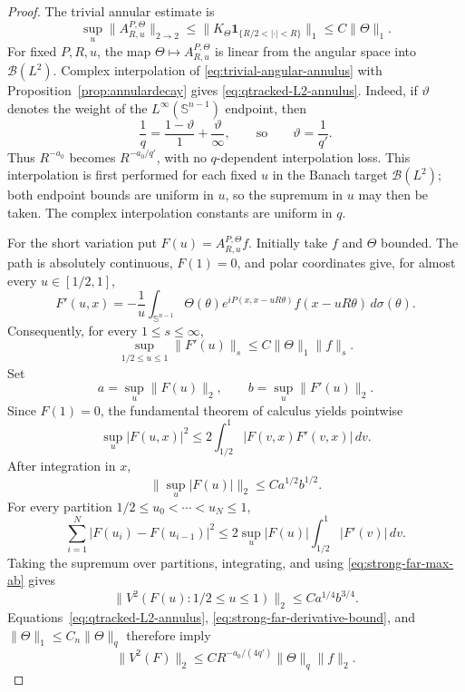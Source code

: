 \documentclass[11pt]{article}
\numberwithin{equation}{section}
\theoremstyle{remark}
\theoremstyle{definition}
\newcommand{\Sph}{\mathbb S}
\newcommand{\norm}[1]{\lVert #1\rVert}
\begin{document}
\begin{proof}
The trivial annular estimate is
\begin{equation}\label{eq:trivial-angular-annulus}
 \sup_u\norm{A^{P,\Theta}_{R,u}}_{2\to2}
 \leq \norm{K_\Theta\mathbf1_{\{R/2<|\cdot|<R\}}}_1
 \leq C\norm\Theta_1.
\end{equation}
For fixed $P,R,u$, the map
$\Theta\mapsto A^{P,\Theta}_{R,u}$ is linear from the angular space into
$\mathcal B(L^2)$.  Complex interpolation of
\eqref{eq:trivial-angular-annulus} with
Proposition~\ref{prop:annulardecay} gives
\eqref{eq:qtracked-L2-annulus}.  Indeed, if $\vartheta$ denotes the weight
of the $L^\infty(\Sph^{n-1})$ endpoint, then
\[
 \frac1q=\frac{1-\vartheta}{1}+\frac{\vartheta}{\infty},
 \qquad\text{so}\qquad \vartheta=\frac1{q'}.
\]
Thus $R^{-a_0}$ becomes $R^{-a_0/q'}$, with no $q$-dependent
interpolation loss.  This interpolation is first performed for each fixed
$u$ in the Banach target $\mathcal B(L^2)$; both endpoint bounds are
uniform in $u$, so the supremum in $u$ may then be taken.  The complex
interpolation constants are uniform in $q$.

For the short variation put $F(u)=A^{P,\Theta}_{R,u}f$.  Initially take
$f$ and $\Theta$ bounded.  The path is absolutely continuous, $F(1)=0$,
and polar coordinates give, for almost every $u\in[1/2,1]$,
\begin{equation}\label{eq:strong-far-derivative}
 F'(u,x)=-\frac1u\int_{\Sph^{n-1}}\Theta(\theta)
 e^{iP(x,x-uR\theta)}f(x-uR\theta)\,d\sigma(\theta).
\end{equation}
Consequently, for every $1\leq s\leq\infty$,
\begin{equation}\label{eq:strong-far-derivative-bound}
 \sup_{1/2\leq u\leq1}\norm{F'(u)}_s
 \leq C\norm\Theta_1\norm f_s.
\end{equation}
Set
\[
 a=\sup_u\norm{F(u)}_2,
 \qquad b=\sup_u\norm{F'(u)}_2.
\]
Since $F(1)=0$, the fundamental theorem of calculus yields pointwise
\[
 \sup_u|F(u,x)|^2
 \leq2\int_{1/2}^1|F(v,x)F'(v,x)|\,dv.
\]
After integration in $x$,
\begin{equation}\label{eq:strong-far-max-ab}
 \norm{\sup_u|F(u)|}_2\leq C a^{1/2}b^{1/2}.
\end{equation}
For every partition $1/2\leq u_0<\cdots<u_N\leq1$,
\[
 \sum_{i=1}^N|F(u_i)-F(u_{i-1})|^2
 \leq2\sup_u|F(u)|\int_{1/2}^1|F'(v)|\,dv.
\]
Taking the supremum over partitions, integrating, and using
\eqref{eq:strong-far-max-ab} gives
\begin{equation}\label{eq:strong-far-a14b34}
 \norm{V^2(F(u):1/2\leq u\leq1)}_2
 \leq C a^{1/4}b^{3/4}.
\end{equation}
Equations~\eqref{eq:qtracked-L2-annulus},
\eqref{eq:strong-far-derivative-bound}, and
$\norm\Theta_1\leq C_n\norm\Theta_q$ therefore imply
\begin{equation}\label{eq:qtracked-short-L2}
 \norm{V^2(F)}_2
 \leq C R^{-a_0/(4q')}\norm\Theta_q\norm f_2.
\end{equation}


\end{proof}
\end{document}
